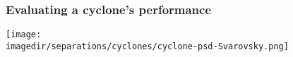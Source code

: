\begin{frame}\frametitle{Evaluating a cyclone's performance}
	\begin{center}
		\texttt{[image: \\imagedir/separations/cyclones/cyclone-psd-Svarovsky.png]}
	\end{center}
\end{frame}

\begin{comment}

\begin{frame}\frametitle{Grade efficiency}
	
\end{frame}

\begin{frame}\frametitle{Pressure drop}
	p 453 C+R v6
\end{frame}


\end{comment}
